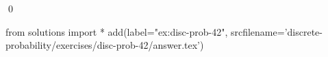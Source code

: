 
\begin{ex} 
  \label{ex:disc-prob-42}
  
  \qed
\end{ex} 
\begin{python0}
from solutions import *
add(label="ex:disc-prob-42",
    srcfilename='discrete-probability/exercises/disc-prob-42/answer.tex') 
\end{python0}
